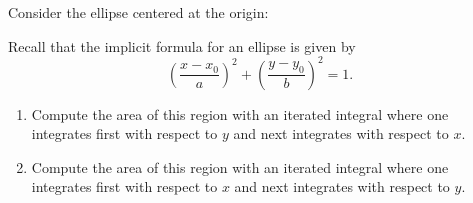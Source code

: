 \documentclass[handout,nooutcomes,noauthor]{ximera}
\begin{document}
\begin{problem}
  Consider the ellipse centered at the origin:
  \begin{image}[2in]
  \end{image}
  Recall that the implicit formula for an ellipse is given by
  \[
  \left(\frac{x-x_0}{a}\right)^2 + \left(\frac{y-y_0}{b}\right)^2 = 1.
  \]
  \begin{enumerate}
   \item Compute the area of this region with an iterated integral
     where one integrates first with respect to $y$ and next
     integrates with respect to $x$.
   \item Compute the area of this region with an iterated integral
     where one integrates first with respect to $x$ and next
     integrates with respect to $y$.
   \end{enumerate}
\end{problem}
\end{document}
